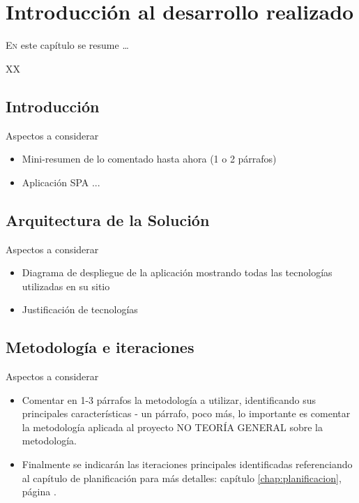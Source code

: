 \chapter{Introducción al desarrollo realizado}
\label{chap:desenrolo}

\lettrine{E}{n} este capítulo se resume \dots

{ \color{red} XX}

\section{Introducción}

{ \color{red} Aspectos a considerar
    \begin{itemize}
      \item Mini-resumen de lo comentado hasta ahora (1 o 2 párrafos)
      \item Aplicación SPA ...
    \end{itemize}
}

\section{Arquitectura de la Solución}

{ \color{red} Aspectos a considerar
    \begin{itemize}
      \item Diagrama de despliegue de la aplicación mostrando todas las tecnologías utilizadas en su sitio
      \item Justificación de tecnologías
    \end{itemize}
}

\section{Metodología e iteraciones}

{ \color{red} Aspectos a considerar
    \begin{itemize}
      \item Comentar en 1-3 párrafos la metodología a utilizar, identificando sus principales características - un párrafo, poco más, lo importante es comentar la metodología aplicada al proyecto NO TEORÍA GENERAL sobre la metodología.
      \item Finalmente se indicarán las iteraciones principales identificadas referenciando al capítulo de planificación para más detalles: capítulo \ref{chap:planificacion}, página \pageref{chap:planificacion}.
    \end{itemize}
}